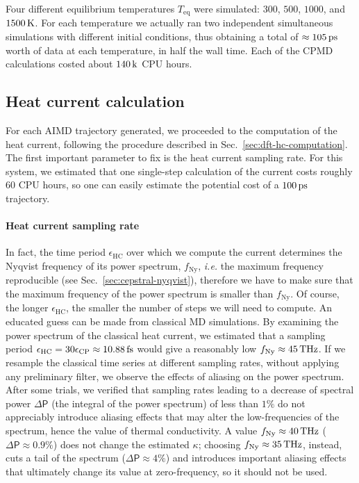 Four different equilibrium temperatures $T_\mathrm{eq}$ were simulated: $300$, $500$, $1000$, and $1500\,\mathrm{K}$. For each temperature we actually ran two independent simultaneous simulations with different initial conditions, thus obtaining a total of $\approx 105\,\mathrm{ps}$ worth of data at each temperature, in half the wall time. 
Each of the CPMD calculations costed about $140\,\mathrm{k}$ CPU hours.



\subsection{Heat current calculation}  \label{sec:results-quantum-current}
For each AIMD trajectory generated, we proceeded to the computation of the \abinitio heat current, following the procedure described in Sec.~\ref{sec:dft-hc-computation}. 
The first important parameter to fix is the heat current sampling rate. For this system, we estimated that one single-step calculation of the current costs roughly $60$ CPU hours, so one can easily estimate the potential cost of a $100\,\mathrm{ps}$ trajectory. 


\paragraph{Heat current sampling rate}
In fact, the time period $\epsilon_\mathrm{HC}$ over which we compute the current determines the Nyqvist frequency of its power spectrum, $f_\mathrm{Ny}$, \emph{i.e.} the maximum frequency reproducible (see Sec.~\ref{sec:cepstral-nyqvist}), therefore we have to make sure that the maximum frequency of the power spectrum is smaller than $f_\mathrm{Ny}$. Of course, the longer $\epsilon_\mathrm{HC}$, the smaller the number of steps we will need to compute. 
An educated guess can be made from classical MD simulations. By examining the power spectrum of the classical heat current, we estimated that a sampling period $\epsilon_\mathrm{HC} = 30 \epsilon_\mathrm{CP} \approx 10.88\,\mathrm{fs}$ would give a reasonably low $f_\mathrm{Ny}\approx 45\,\mathrm{THz}$. 
If we resample the classical time series at different sampling rates, without applying any preliminary filter, we observe the effects of aliasing on the power spectrum. 
After some trials, we verified that sampling rates leading to a decrease of spectral power $\Delta\mathsf{P}$ (the integral of the power spectrum) of less than $1\%$ do not appreciably introduce aliasing effects that may alter the low-frequencies of the spectrum, hence the value of thermal conductivity. A value $f_\mathrm{Ny} \approx 40\,\mathrm{THz}$ ($\Delta\mathsf{P} \approx 0.9\%$) does not change the estimated $\kappa$; choosing $f_\mathrm{Ny} \approx 35\,\mathrm{THz}$, instead, cuts a tail of the spectrum ($\Delta\mathsf{P} \approx 4\%$) and introduces important aliasing effects that ultimately change its value at zero-frequency, so it should not be used. 

